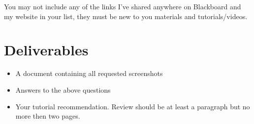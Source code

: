 \documentclass[12pt]{article}
\begin{document}
You may not include any of the links I've shared anywhere on Blackboard and my website in your list, they must be new to you materials and tutorials/videos. 


\section*{Deliverables}
\begin{itemize}
    \item A document containing all requested screenshots
    \item Answers to the above questions
    \item Your tutorial recommendation.  Review should be at least a paragraph but no more then two pages. 
\end{itemize} 
\end{document}
